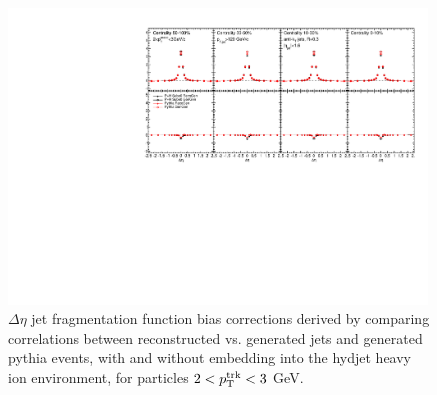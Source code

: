                       \begin{figure}[hbtp]
          \begin{center}\includegraphics[width=0.99\textwidth]{figures/JFF_SpillOver/JFF_Residual_Corrections_Eta_Inclusive_TrkPt2_TrkPt3.pdf}
          \caption[Jet fragmentation function bias corrections for particles with $2<p_{\rm T}^{\rm trk}<3$ GeV]{$\Delta\eta$ jet fragmentation function bias corrections derived by comparing correlations between reconstructed vs. generated jets and generated {\sc pythia} events, with and without embedding into the {\sc hydjet} heavy ion environment, for particles $2<p_{\rm T}^{\rm trk}<3$ GeV.}
            \label{fig:jff_residual_inclusive_trkpt2_trkpt3}
            \end{center}
            \end{figure}
            
